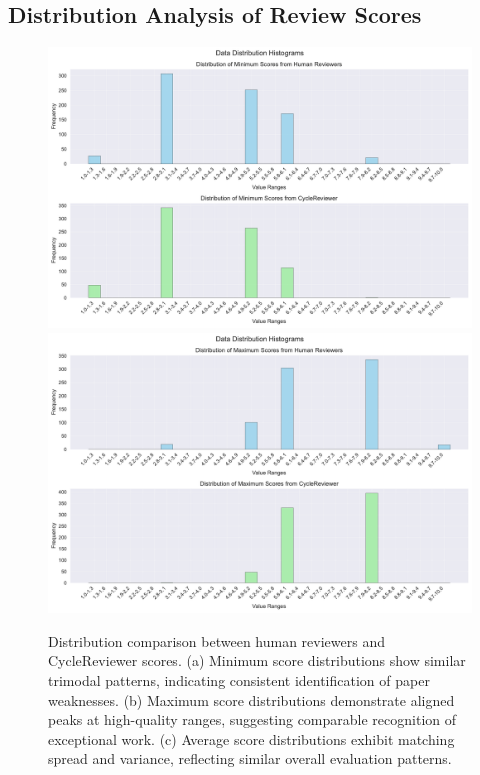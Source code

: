 \documentclass{article} %
\begin{document}
\subsection{Distribution Analysis of Review Scores}

\begin{figure}[h]
\centering
\includegraphics[width=\textwidth]{minscore.pdf}
\includegraphics[width=\textwidth]{maxscore.pdf}

\caption{Distribution comparison between human reviewers and CycleReviewer scores. (a) Minimum score distributions show similar trimodal patterns, indicating consistent identification of paper weaknesses. (b) Maximum score distributions demonstrate aligned peaks at high-quality ranges, suggesting comparable recognition of exceptional work. (c) Average score distributions exhibit matching spread and variance, reflecting similar overall evaluation patterns.}
\label{fig:score_dist}
\end{figure}
\end{document}
